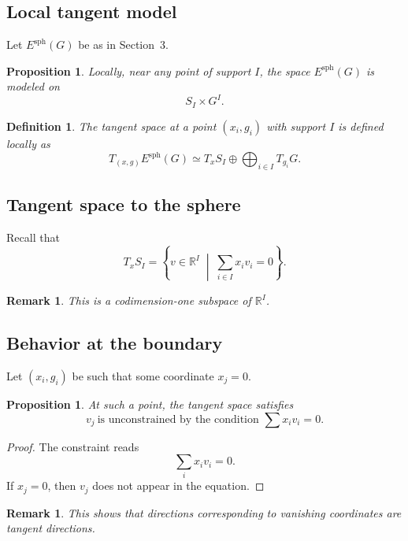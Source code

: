 \documentclass[11pt]{amsart}
\newtheorem{proposition}[theorem]{Proposition}
\newtheorem{definition}[theorem]{Definition}
\newtheorem{remark}[theorem]{Remark}
\begin{document}
\subsection{Local tangent model}

Let $E^{\mathrm{sph}}(G)$ be as in Section~3.

\begin{proposition}
Locally, near any point of support $I$, the space $E^{\mathrm{sph}}(G)$ is modeled on
\[
S_I \times G^I.
\]
\end{proposition}

\begin{definition}
The tangent space at a point $(x_i,g_i)$ with support $I$ is defined locally as
\[
T_{(x,g)} E^{\mathrm{sph}}(G)
\simeq T_x S_I \oplus \bigoplus_{i\in I} T_{g_i} G.
\]
\end{definition}

\subsection{Tangent space to the sphere}

Recall that
\[
T_x S_I = \left\{ v \in \mathbb{R}^I \;\middle|\; \sum_{i\in I} x_i v_i = 0 \right\}.
\]

\begin{remark}
This is a codimension-one subspace of $\mathbb{R}^I$.
\end{remark}

\subsection{Behavior at the boundary}

Let $(x_i,g_i)$ be such that some coordinate $x_j = 0$.

\begin{proposition}
At such a point, the tangent space satisfies
\[
v_j \ \text{is unconstrained by the condition } \sum x_i v_i = 0.
\]
\end{proposition}

\begin{proof}
The constraint reads
\[
\sum_i x_i v_i = 0.
\]
If $x_j = 0$, then $v_j$ does not appear in the equation.
\end{proof}

\begin{remark}
This shows that directions corresponding to vanishing coordinates are tangent directions.
\end{remark}
\end{document}
